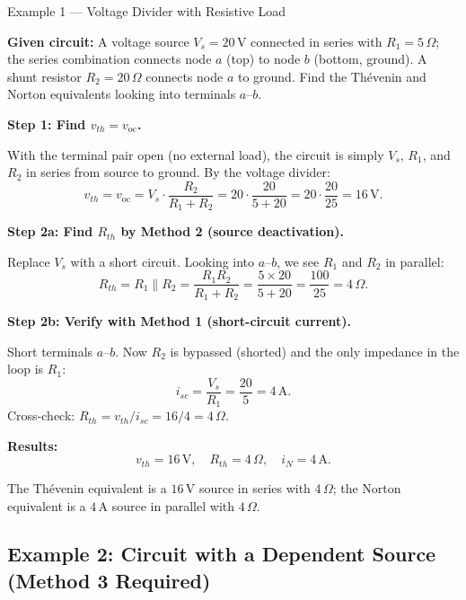 \documentclass[twoside]{article}
\begin{document}
\begin{greenbox}{}{Example 1 — Voltage Divider with Resistive Load}

\textbf{Given circuit:} A voltage source $V_s = 20\,\mathrm{V}$ connected in series with $R_1 = 5\,\Omega$; the series combination connects node $a$ (top) to node $b$ (bottom, ground).  A shunt resistor $R_2 = 20\,\Omega$ connects node $a$ to ground.  Find the Th\'{e}venin and Norton equivalents looking into terminals $a$--$b$.

\textbf{Step 1: Find $v_{th} = v_{\mathrm{oc}}$.}

With the terminal pair open (no external load), the circuit is simply $V_s$, $R_1$, and $R_2$ in series from source to ground.  By the voltage divider:
\[
    v_{th} = v_{\mathrm{oc}} = V_s \cdot \frac{R_2}{R_1 + R_2}
           = 20 \cdot \frac{20}{5 + 20} = 20 \cdot \frac{20}{25} = 16\,\mathrm{V}.
\]

\textbf{Step 2a: Find $R_{th}$ by Method 2 (source deactivation).}

Replace $V_s$ with a short circuit.  Looking into $a$--$b$, we see $R_1$ and $R_2$ in parallel:
\[
    R_{th} = R_1 \| R_2 = \frac{R_1 R_2}{R_1 + R_2}
           = \frac{5 \times 20}{5 + 20} = \frac{100}{25} = 4\,\Omega.
\]

\textbf{Step 2b: Verify with Method 1 (short-circuit current).}

Short terminals $a$--$b$.  Now $R_2$ is bypassed (shorted) and the only impedance in the loop is $R_1$:
\[
    i_{sc} = \frac{V_s}{R_1} = \frac{20}{5} = 4\,\mathrm{A}.
\]
Cross-check: $R_{th} = v_{th}/i_{sc} = 16/4 = 4\,\Omega$. \checkmark

\textbf{Results:}
\[
    \boxed{v_{th} = 16\,\mathrm{V}, \quad R_{th} = 4\,\Omega, \quad i_N = 4\,\mathrm{A}.}
\]

The Th\'{e}venin equivalent is a $16\,\mathrm{V}$ source in series with $4\,\Omega$; the Norton equivalent is a $4\,\mathrm{A}$ source in parallel with $4\,\Omega$.
\end{greenbox}

\subsection{Example 2: Circuit with a Dependent Source (Method 3 Required)}
\end{document}
